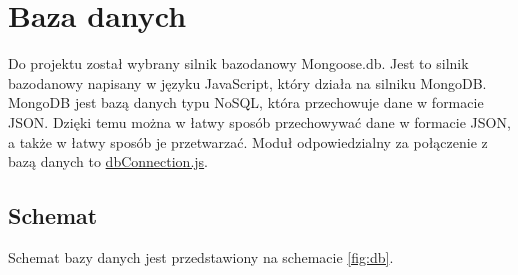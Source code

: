\documentclass{documentation}
\begin{document}
\section{Baza danych}

Do projektu został wybrany silnik bazodanowy Mongoose.db.
Jest to silnik bazodanowy napisany w języku JavaScript, który działa na silniku MongoDB.
MongoDB jest bazą danych typu NoSQL, która przechowuje dane w formacie JSON.
Dzięki temu można w łatwy sposób przechowywać dane w formacie JSON, a także w łatwy sposób je przetwarzać.
Moduł odpowiedzialny za połączenie z bazą danych to \href{https://github.com/Stanlee77/ASSASSIN/blob/master/backend/db/dbConnection.js}{dbConnection.js}.

\subsection{Schemat}

Schemat bazy danych jest przedstawiony na schemacie \ref{fig:db}.
\end{document}

